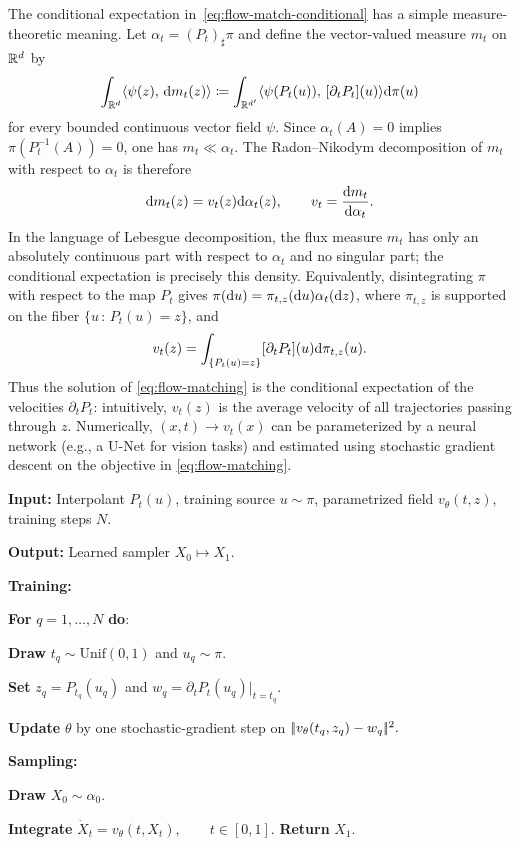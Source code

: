 The conditional expectation in~\eqref{eq:flow-match-conditional} has a simple measure-theoretic meaning. Let $\alpha_t=(P_t)_\sharp\pi$ and define the vector-valued measure $m_t$ on $\mathbb{R}^d$ by
\[
	\int_{\mathbb{R}^d}\langle \psi(z),\,\mathrm{d} m_t(z)\rangle
	\coloneqq
	\int_{\mathbb{R}^{d'}}\langle \psi(P_t(u)),\,[\partial_tP_t](u)\rangle\mathrm{d}\pi(u)
\]
for every bounded continuous vector field $\psi$. Since $\alpha_t(A)=0$ implies $\pi(P_t^{-1}(A))=0$, one has $m_t\ll\alpha_t$. The Radon--Nikodym decomposition of $m_t$ with respect to $\alpha_t$ is therefore
\[
	\mathrm{d} m_t(z)=v_t(z)\mathrm{d}\alpha_t(z),
	\qquad
	v_t=\frac{\mathrm{d} m_t}{\mathrm{d}\alpha_t}.
\]
In the language of Lebesgue decomposition, the flux measure $m_t$ has only an absolutely continuous part with respect to $\alpha_t$ and no singular part; the conditional expectation is precisely this density.
Equivalently, disintegrating $\pi$ with respect to the map $P_t$ gives $\pi(\mathrm{d} u)=\pi_{t,z}(\mathrm{d} u)\alpha_t(\mathrm{d} z)$, where $\pi_{t,z}$ is supported on the fiber $\{u\,:\,P_t(u)=z\}$, and
\[
	v_t(z)=\int_{\{P_t(u)=z\}}[\partial_tP_t](u)\mathrm{d}\pi_{t,z}(u).
\]
Thus the solution of \eqref{eq:flow-matching} is the conditional expectation of the velocities $\partial_t P_t$: intuitively, $v_t(z)$ is the average velocity of all trajectories passing through $z$.
%
Numerically, $(x,t) \to v_t(x)$ can be parameterized by a neural network (e.g., a U-Net for vision tasks) and estimated using stochastic gradient descent on the objective in \eqref{eq:flow-matching}.
%

\begin{alg}\label{alg:flow-matching-regression}
\textbf{Input:} Interpolant $P_t(u)$, training source $u\sim\pi$, parametrized field $v_\theta(t,z)$, training steps $N$.

\textbf{Output:} Learned sampler $X_0\mapsto X_1$.

\textbf{Training:}

\textbf{For} $q=1,\ldots,N$ \textbf{do}:
\begin{algblock}
\textbf{Draw} $t_q\sim\mathrm{Unif}(0,1)$ and $u_q\sim\pi$.

\textbf{Set} $z_q=P_{t_q}(u_q)$ and $w_q=\partial_tP_t(u_q)|_{t=t_q}$.

\textbf{Update} $\theta$ by one stochastic-gradient step on \(|\!| v_\theta(t_q,z_q)-w_q |\!|^2.\)

\end{algblock}

\textbf{Sampling:}

\textbf{Draw} $X_0\sim\alpha_0$.

\textbf{Integrate}
\(\dot X_t=v_\theta(t,X_t), \qquad t\in[0,1].\)
\textbf{Return} $X_1$.
\end{alg}

